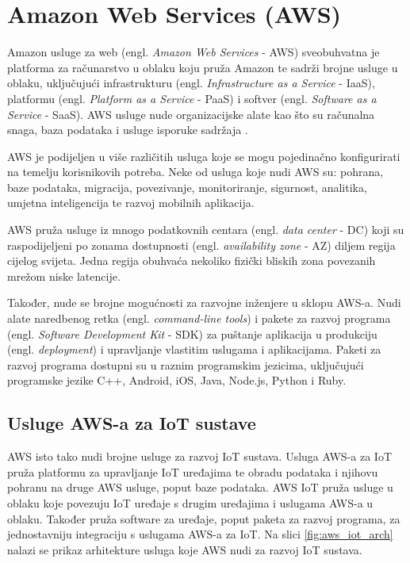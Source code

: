 \chapter{Amazon Web Services (AWS)}

Amazon usluge za web (engl. \textit{Amazon Web Services} - AWS) sveobuhvatna je platforma za računarstvo u oblaku koju pruža Amazon te sadrži brojne usluge u oblaku, uključujući infrastrukturu (engl. \textit{Infrastructure as a Service} - IaaS), platformu (engl. \textit{Platform as a Service} - PaaS) i softver (engl. \textit{Software as a Service} - SaaS). AWS usluge nude organizacijske alate kao što su računalna snaga, baza podataka i usluge isporuke sadržaja \cite{what_is_aws}. 

AWS je podijeljen u više različitih usluga koje se mogu pojedinačno konfigurirati na temelju korisnikovih potreba. Neke od usluga koje nudi AWS su: pohrana, baze podataka, migracija, povezivanje, monitoriranje, sigurnost, analitika, umjetna inteligencija te razvoj mobilnih aplikacija. 

AWS pruža usluge iz mnogo podatkovnih centara (engl. \textit{data center} - DC) koji su raspodijeljeni po zonama dostupnosti (engl. \textit{availability zone} - AZ) diljem regija cijelog svijeta. Jedna regija obuhvaća nekoliko fizički bliskih zona povezanih mrežom niske latencije. 

Također, nude se brojne mogućnosti za razvojne inženjere u sklopu AWS-a. Nudi alate naredbenog retka (engl. \textit{command-line tools}) i pakete za razvoj programa (engl. \textit{Software Development Kit} - SDK) za puštanje aplikacija u produkciju (engl. \textit{deployment}) i upravljanje vlastitim uslugama i aplikacijama. Paketi za razvoj programa dostupni su u raznim programskim jezicima, uključujući programske jezike C++, Android, iOS, Java, Node.js, Python i Ruby.
 
\section{Usluge AWS-a za IoT sustave}

AWS isto tako nudi brojne usluge za razvoj IoT sustava. Usluga AWS-a za IoT pruža platformu za upravljanje IoT uređajima te obradu podataka i njihovu pohranu na druge AWS usluge, poput baze podataka. AWS IoT pruža usluge u oblaku koje povezuju IoT uređaje s drugim uređajima i uslugama AWS-a u oblaku. Također pruža software za uređaje, poput paketa za razvoj programa, za jednostavniju integraciju s uslugama AWS-a za IoT. Na slici \ref{fig:aws_iot_arch} nalazi se prikaz arhitekture usluga koje AWS nudi za razvoj IoT sustava.

